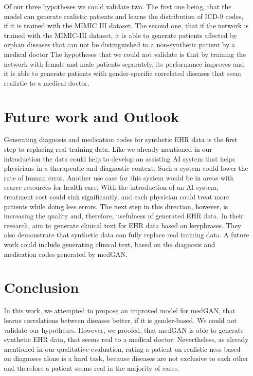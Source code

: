 \documentclass[11pt, a4paper, oneside]{book}
\begin{document}
Of our three hypotheses we could validate two. The first one being, that the model can generate realistic patients and learns the distribution of ICD-9 codes, if it is trained with the MIMIC III dataset. The second one, that if the network is trained with the MIMIC-III dataset, it is able to generate patients affected by orphan diseases that can not be distinguished to a non-synthetic patient by a medical doctor
The hypotheses that we could not validate is that by training the network with female and male patients separately, its performance improves and it is able to generate patients with gender-specific correlated diseases that seem realistic to a medical doctor.

\section{Future work and Outlook}
Generating diagnosis and medication codes for synthetic EHR data is the first step to replacing real training data. Like we already mentioned in our introduction the data could help to develop an assisting AI system that helps physicians in a therapeutic and diagnostic context. Such a system could lower the rate of human error. Another use case for this system would be in areas with scarce resources for health care. With the introduction of an AI system, treatment cost could sink significantly, and each physician could treat more patients while doing less errors. The next step in this direction, however, is increasing the quality and, therefore, usefulness of generated EHR data. In their research, \cite{wang-etal-2019-artificial} aim to generate clinical text for EHR data based on keyphrases. They also demonstrate that synthetic data can fully replace real training data. A future work could include generating clinical text, based on the diagnosis and medication codes generated by medGAN.

\section{Conclusion}
In this work, we attempted to propose an improved model for medGAN, that learns correlations between diseases better, if it is gender-based. We could not validate our hypotheses. However, we proofed, that medGAN is able to generate synthetic EHR data, that seems real to a medical doctor. Nevertheless, as already mentioned in our qualitative evaluation, rating a patient on realistic-ness based on diagnoses alone is a hard task, because diseases are not exclusive to each other and therefore a patient seems real in the majority of cases.
\end{document}
